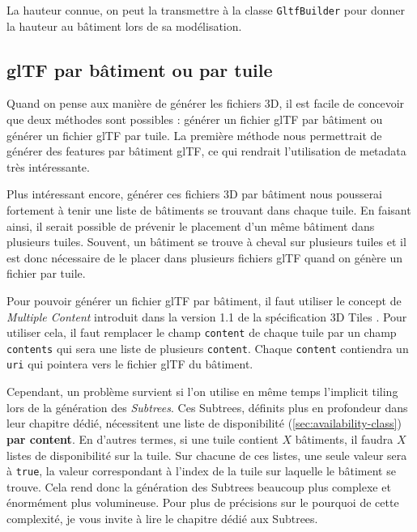 La hauteur connue, on peut la transmettre à la classe \texttt{GltfBuilder} pour donner la hauteur au bâtiment lors de sa modélisation.

\subsection{glTF par bâtiment ou par tuile}

Quand on pense aux manière de générer les fichiers 3D, il est facile de concevoir que deux méthodes sont possibles : générer un fichier glTF par bâtiment ou générer un fichier glTF par tuile. La première méthode nous permettrait de générer des features par bâtiment glTF, ce qui rendrait l'utilisation de metadata très intéressante.

Plus intéressant encore, générer ces fichiers 3D par bâtiment nous pousserai fortement à tenir une liste de bâtiments se trouvant dans chaque tuile. En faisant ainsi, il serait possible de prévenir le placement d'un même bâtiment dans plusieurs tuiles. Souvent, un bâtiment se trouve à cheval sur plusieurs tuiles et il est donc nécessaire de le placer dans plusieurs fichiers glTF quand on génère un fichier par tuile.

Pour pouvoir générer un fichier glTF par bâtiment, il faut utiliser le concept de \textit{Multiple Content} introduit dans la version 1.1 de la spécification 3D Tiles \cite{3d-tiles-reference-card-v1_1}. Pour utiliser cela, il faut remplacer le champ \texttt{content} de chaque tuile par un champ \texttt{contents} qui sera une liste de plusieurs \texttt{content}. Chaque \texttt{content} contiendra un \texttt{uri} qui pointera vers le fichier glTF du bâtiment.

Cependant, un problème survient si l'on utilise en même temps l'implicit tiling lors de la génération des \textit{Subtrees}. Ces Subtrees, définits plus en profondeur dans leur chapitre dédié, nécessitent une liste de disponibilité (\autoref{sec:availability-class}) \textbf{par content}. En d'autres termes, si une tuile contient $X$ bâtiments, il faudra $X$ listes de disponibilité sur la tuile. Sur chacune de ces listes, une seule valeur sera à \texttt{true}, la valeur correspondant à l'index de la tuile sur laquelle le bâtiment se trouve. Cela rend donc la génération des Subtrees beaucoup plus complexe et énormément plus volumineuse. Pour plus de précisions sur le pourquoi de cette complexité, je vous invite à lire le chapitre dédié aux Subtrees.